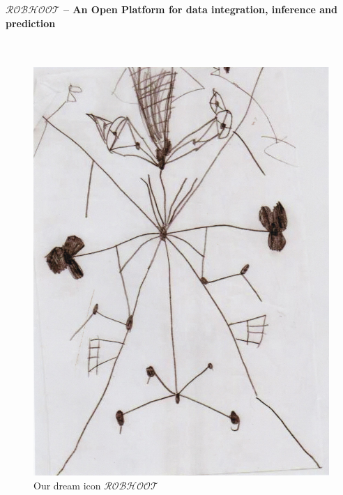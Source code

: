 \documentclass[english,12pt]{article}
\date{}
\begin{document}
\begin{flushleft}
\textbf{\Large {$\mathcal{ROBHOOT}$} -- An Open Platform for data integration, inference and prediction}
\\
\\
\\
\begin{figure}
\vspace{-3 in}
\begin{center}
\includegraphics[scale=0.4]{robhoot.pdf}
\end{center}
\caption{Our dream icon $\mathcal{ROBHOOT}$}
\end{figure}
\end{flushleft}
\end{document}
